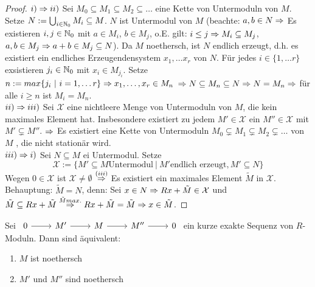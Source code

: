 	\begin{proof} 
		$i) \Rightarrow ii)$ Sei $M_0 \subseteq M_1 \subseteq M_2 \subseteq \dots $ eine Kette von Untermoduln von $M$. Setze $N := \bigcup_{i \in \mathbb{N}_0} M_i \subseteq M$. $N$ ist Untermodul von $M$ (beachte: $ a,b \in N \Rightarrow $ Es existieren $i,j \in \mathbb{N}_0$ mit $a \in M_i$, $b \in M_j$, o.E. gilt: $i\leq j \Rightarrow M_i \subseteq M_j$, $a,b \in M_j \Rightarrow a+b \in M_j \subseteq N$). Da $M$ noethersch, ist $N$ endlich erzeugt, d.h. es existiert ein endliches Erzeugendensystem $x_1, \dots x_r$ von $N$. Für jedes $i \in \{1,\dots r\} $ exsistieren $j_i \in \mathbb{N}_0 $ mit $x_i \in M_{j_i}$. Setze $n:= max\{j_i \ | \ i = 1, \dots r \} \Rightarrow x_1,\dots, x_r \in M_n$ $ \Rightarrow N \subseteq M_n \subseteq N \Rightarrow N = M_n \Rightarrow $ für alle $i \geq n $ ist $ M _i=M_n$.\\
		$ii) \Rightarrow iii)$ Sei $\mathcal{X}$ eine nichtleere Menge von Untermoduln von $M$, die kein maximales Element hat. Insbesondere existiert zu jedem $ M' \in \mathcal{X} $ ein $M'' \in \mathcal{X} $ mit $M' \subsetneq M''$. $\Rightarrow$ Es existiert eine Kette von Untermoduln $M_0 \subsetneq M_1 \subsetneq M_2 \subsetneq \dots $ von $M$ , die nicht stationär wird.\\
		$iii) \Rightarrow i)$ Sei $N \subseteq M $ ei Untermodul. Setze $$\mathcal{X} := \{M' \subseteq M \text {Untermodul} \ | \ M' \text{endlich erzeugt}, M' \subseteq N\}$$Wegen $0 \in \mathcal{X}$ ist $\mathcal{X} \neq \emptyset $ $\overset{(iii)}{\Rightarrow}$ Es existiert ein maximales Element $\tilde{M} $ in $\mathcal{X}$. \\
		Behauptung: $\tilde{M} = N$, denn: Sei $ x \in N \Rightarrow Rx+\tilde{M} \in \mathcal{X} $ und $ \tilde{M} \subseteq Rx+\tilde{M} \overset{\tilde{M} max.}{\Rightarrow} Rx+\tilde{M} = \tilde{M} \Rightarrow x \in \tilde{M}$.
	\end{proof}
\begin{bem}\label{bem3.4}
	Sei $\begin{tikzcd}
	0  \arrow{r} & M' \arrow{r} & M \arrow{r} & M'' \arrow{r} & 0
	\end{tikzcd} $ ein kurze exakte Sequenz von $R$-Moduln. Dann sind äquivalent: 
	\begin{enumerate} [label= \roman*)]
		\item $M$ ist noethersch
		\item $M'$ und $M''$ sind noethersch
	\end{enumerate}
\end{bem}

